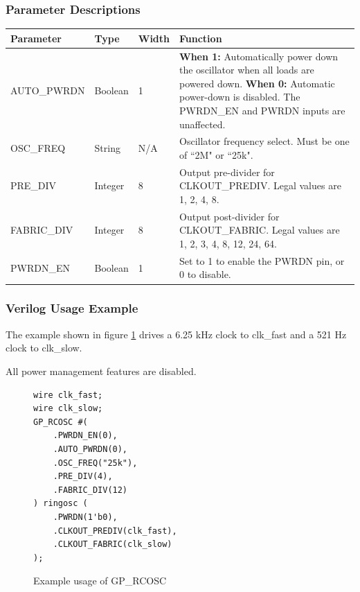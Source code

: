 \documentclass[11pt]{article}
\begin{document}
\subsubsection{Parameter Descriptions}

\begin{tabularx}{5in}{|l|l|l|X|}
\hline
{\bfseries Parameter} & {\bfseries Type} & {\bfseries Width} & {\bfseries Function} \\
\hline
AUTO\_PWRDN & Boolean & 1 & 
	{\bfseries When 1: } \newline Automatically power down the oscillator when all loads are powered down. \newline
	{\bfseries When 0: } \newline Automatic power-down is disabled. The PWRDN\_EN and PWRDN inputs are unaffected.\\
\hline
OSC\_FREQ & String & N/A & Oscillator frequency select. Must be one of ``2M" or ``25k". \\
\hline
PRE\_DIV & Integer & 8 &
	Output pre-divider for CLKOUT\_PREDIV. Legal values are 1, 2, 4, 8. \\
\hline
FABRIC\_DIV & Integer & 8 &
	Output post-divider for CLKOUT\_FABRIC. Legal values are 1, 2, 3, 4, 8, 12, 24, 64. \\
\hline
PWRDN\_EN & Boolean & 1 & Set to 1 to enable the PWRDN pin, or 0 to disable. \\
\hline
\end{tabularx}

\pagebreak
\subsubsection{Verilog Usage Example}

The example shown in figure \ref{gp-rcosc-example} drives a 6.25 kHz clock to clk\_fast and a 521 Hz clock to
clk\_slow.

All power management features are disabled.

\begin{figure}[h]
\begin{lstlisting}
wire clk_fast;
wire clk_slow;
GP_RCOSC #(
	.PWRDN_EN(0),
	.AUTO_PWRDN(0),
	.OSC_FREQ("25k"),
	.PRE_DIV(4),
	.FABRIC_DIV(12)
) ringosc (
	.PWRDN(1'b0),
	.CLKOUT_PREDIV(clk_fast),
	.CLKOUT_FABRIC(clk_slow)
);
\end{lstlisting}
\caption{Example usage of GP\_RCOSC}
\label{gp-rcosc-example}
\end{figure}

\end{document}
